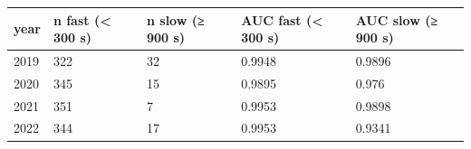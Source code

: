 \begin{tabular}{lllll}
\toprule
\textbf{year} & \textbf{n fast (< 300 s)} & \textbf{n slow (≥ 900 s)} & \textbf{AUC fast (< 300 s)} & \textbf{AUC slow (≥ 900 s)} \\
\midrule
2019 & 322 & 32 & 0.9948 & 0.9896 \\
2020 & 345 & 15 & 0.9895 & 0.976 \\
2021 & 351 & 7 & 0.9953 & 0.9898 \\
2022 & 344 & 17 & 0.9953 & 0.9341 \\
\bottomrule
\end{tabular}
